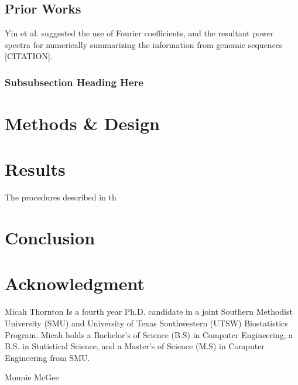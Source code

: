 \documentclass[12pt,journal,compsoc]{IEEEtran}
\begin{document}
\subsection{Prior Works}
\label{sec:pw}
Yin et al. suggested the use of Fourier coefficients, and the resultant power spectra for numerically summarizing the information from genomic sequences [CITATION].


\subsubsection{Subsubsection Heading Here}



\section{Methods \& Design}
\label{sec:meth} 

\section{Results} 
\label{sec:res}

The procedures described in th

\section{Conclusion}
\label{sec:conc}


\appendices

\section*{Acknowledgment}





\begin{IEEEbiographynophoto}{Micah Thornton}
Is a fourth year Ph.D. candidate in a joint Southern Methodist University (SMU) and University of Texas Southwestern (UTSW) Biostatistics Program.  Micah holds a Bachelor's of Science (B.S) in Computer Engineering, a B.S. in Statistical Science, and a Master's of Science (M.S) in Computer Engineering from SMU. 
\end{IEEEbiographynophoto}

\begin{IEEEbiographynophoto}{Monnie McGee} 

\end{IEEEbiographynophoto}
\end{document}

